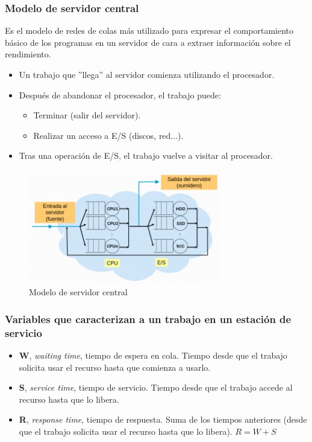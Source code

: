 \documentclass[12pt,spanish]{article}
\begin{document}
\subsubsection{Modelo de servidor central}

Es el modelo de redes de colas más utilizado para expresar el comportamiento básico de los programas en un servidor de cara a extraer información sobre el rendimiento.
\begin{itemize}
	\item Un trabajo que ''llega'' al servidor comienza utilizando el procesador.
	\item Después de abandonar el procesador, el trabajo puede:
		\begin{itemize}
			\item Terminar (salir del servidor).
			\item Realizar un acceso a E/S (discos, red...).
		\end{itemize}
		\item Tras una operación de E/S, el trabajo vuelve a visitar al procesador.
\end{itemize}

\begin{figure}[H]
	\centering
	\includegraphics[width=0.75\textwidth]{modelocentral.png}
	\caption{Modelo de servidor central}
\end{figure}

\subsubsection{Variables que caracterizan a un trabajo en un estación de servicio}

\begin{itemize}
	\item \textbf{W}, \textit{waiting time}, tiempo de espera en cola. Tiempo desde que el trabajo solicita usar el recurso hasta que comienza a usarlo.
	\item \textbf{S}, \textit{service time}, tiempo de servicio. Tiempo desde que el trabajo accede al recurso hasta que lo libera.
	\item \textbf{R}, \textit{response time}, tiempo de respuesta. Suma de los tiempos anteriores (desde que el trabajo solicita usar el recurso hasta que lo libera). $R = W + S$
\end{itemize}
\end{document}
